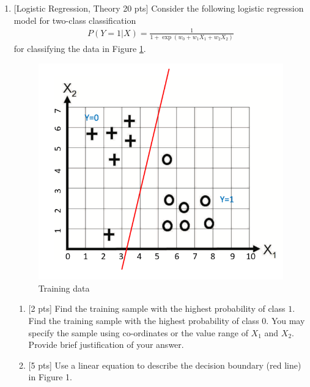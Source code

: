 \documentclass[11pt]{article}
\begin{document}
\begin{enumerate}



\item {[Logistic Regression, Theory 20 pts]}
Consider the following logistic regression model for two-class classification
\begin{align*}
P(Y=1|X) = \frac{1}{1+\exp(w_0+w_1X_1+w_2X_2)}
\end{align*}
for classifying the data in Figure \ref{fig:db}.

\begin{figure}[H]
\centering
\includegraphics[scale=0.4]{HW2_Q1.png}
\caption{Training data}
\label{fig:db}
\end{figure}

\begin{enumerate}
\item {[2 pts]} Find the training sample with the highest probability of class $1$. Find the training sample
with the highest probability of class $0$. You may specify the sample using co-ordinates or the value range of $X_1$ and $X_2$. Provide brief justification of your answer.

\begin{tcolorbox}[fit,height=3cm, width=15cm, blank, borderline={1pt}{-2pt},nobeforeafter]

\end{tcolorbox}
\item {[5 pts]}
Use a linear equation to describe the decision boundary (red line) in Figure 1.


\end{enumerate}
\end{enumerate}
\end{document}
